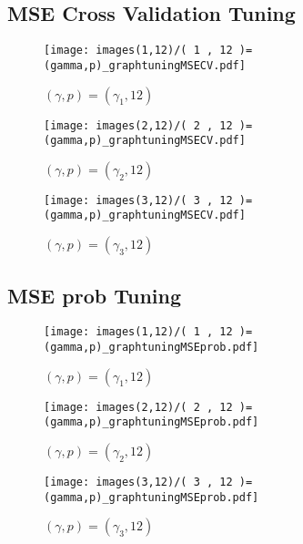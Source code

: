 \documentclass[main.tex]{subfiles}
\begin{document}
\subsection{MSE Cross Validation Tuning}
\begin{figure}[H]
    \centering
    \texttt{[image: images(1,12)/( 1 , 12 )=(gamma,p)\_graphtuningMSECV.pdf]}
    \caption{$(\gamma, p) = (\gamma_1, 12)$}
    \label{fig:MSECV1-12}
\end{figure}
\begin{figure}[H]
    \centering
    \texttt{[image: images(2,12)/( 2 , 12 )=(gamma,p)\_graphtuningMSECV.pdf]}
    \caption{$(\gamma, p) = (\gamma_2, 12)$}
    \label{fig:MSECV2-12}
\end{figure}
\begin{figure}[H]
    \centering
    \texttt{[image: images(3,12)/( 3 , 12 )=(gamma,p)\_graphtuningMSECV.pdf]}
    \caption{$(\gamma, p) = (\gamma_3, 12)$}
    \label{fig:MSECV3-12}
\end{figure}

\subsection{MSE prob Tuning}
\begin{figure}[H]
    \centering
    \texttt{[image: images(1,12)/( 1 , 12 )=(gamma,p)\_graphtuningMSEprob.pdf]}
    \caption{$(\gamma, p) = (\gamma_1, 12)$}
    \label{fig:MSEprob1-12}
\end{figure}
\begin{figure}[H]
    \centering
    \texttt{[image: images(2,12)/( 2 , 12 )=(gamma,p)\_graphtuningMSEprob.pdf]}
    \caption{$(\gamma, p) = (\gamma_2, 12)$}
    \label{fig:MSEprob2-12}
\end{figure}
\begin{figure}[H]
    \centering
    \texttt{[image: images(3,12)/( 3 , 12 )=(gamma,p)\_graphtuningMSEprob.pdf]}
    \caption{$(\gamma, p) = (\gamma_3, 12)$}
    \label{fig:MSEprob3-12}
\end{figure}
\end{document}
